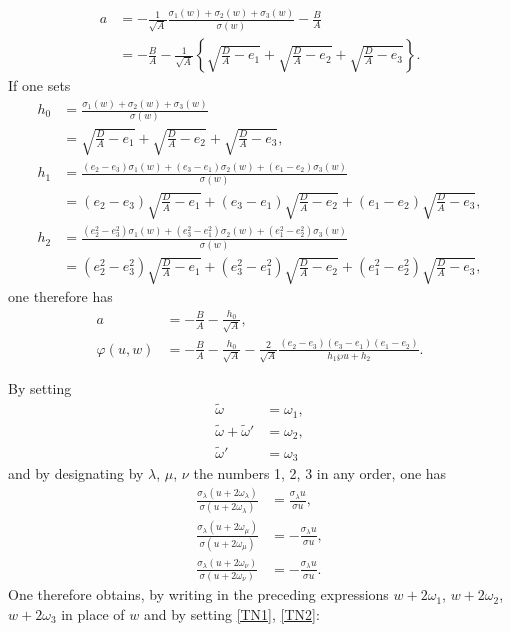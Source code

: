 \documentclass{article}
\newcommand{\tnref}[1]{\hyperlink{#1}{[#1]}}
\begin{document}
\begin{align*}
a &= -\frac{1}{\sqrt{A}}\frac{\sigma_1(w) + \sigma_2(w) + \sigma_3(w)}{\sigma(w)} - \frac{B}{A} \\
&= -\frac{B}{A} - \frac{1}{\sqrt{A}}\left\{\sqrt{\frac{D}{A} - e_1} + \sqrt{\frac{D}{A} - e_2} + \sqrt{\frac{D}{A} - e_3}\right\}.
\end{align*}
If one sets
\begin{align*}
h_0 &= \frac{\sigma_1(w) + \sigma_2(w) + \sigma_3(w)}{\sigma(w)} \\
&= \sqrt{\frac{D}{A} - e_1} + \sqrt{\frac{D}{A} - e_2} + \sqrt{\frac{D}{A} - e_3}, \\
h_1 &= \frac{(e_2 - e_3)\sigma_1(w) + (e_3 - e_1)\sigma_2(w) + (e_1 - e_2)\sigma_3(w)}{\sigma(w)} \\
&= (e_2 - e_3)\sqrt{\frac{D}{A} - e_1} + (e_3 - e_1)\sqrt{\frac{D}{A} - e_2} + (e_1 - e_2)\sqrt{\frac{D}{A} - e_3}, \\
h_2 &= \frac{(e_2^2 - e_3^2)\sigma_1(w) + (e_3^2 - e_1^2)\sigma_2(w) + (e_1^2 - e_2^2)\sigma_3(w)}{\sigma(w)} \\
&= (e_2^2 - e_3^2)\sqrt{\frac{D}{A} - e_1} + (e_3^2 - e_1^2)\sqrt{\frac{D}{A} - e_2} + (e_1^2 - e_2^2)\sqrt{\frac{D}{A} - e_3},
\end{align*}
one therefore has
\begin{align*}
a &= -\frac{B}{A} - \frac{h_0}{\sqrt{A}}, \\
\varphi(u, w) &= -\frac{B}{A} - \frac{h_0}{\sqrt{A}} - \frac{2}{\sqrt{A}}\frac{(e_2 - e_3)(e_3 - e_1)(e_1 - e_2)}{h_1\wp u + h_2}.
\end{align*}

By setting
\begin{align*}
\tilde{\omega} &= \omega_1, \\
\tilde{\omega} + \tilde{\omega}' &= \omega_2, \\
\tilde{\omega}' &= \omega_3
\end{align*}
and by designating by $\lambda$, $\mu$, $\nu$ the numbers 1, 2, 3 in any order, one has
\begin{align*}
\frac{\sigma_\lambda(u + 2\omega_\lambda)}{\sigma(u + 2\omega_\lambda)} &= \frac{\sigma_\lambda u}{\sigma u}, \\
\frac{\sigma_\lambda(u + 2\omega_\mu)}{\sigma(u + 2\omega_\mu)} &= -\frac{\sigma_\lambda u}{\sigma u}, \\
\frac{\sigma_\lambda(u + 2\omega_\nu)}{\sigma(u + 2\omega_\nu)} &= -\frac{\sigma_\lambda u}{\sigma u}.
\end{align*}
One therefore obtains, by writing in the preceding expressions $w + 2\omega_1$, $w + 2\omega_2$, $w + 2\omega_3$ in place of $w$ and by setting \hypertarget{TN1-ref}{}\hypertarget{TN2-ref}{}\tnref{TN1}, \tnref{TN2}:
\end{document}
